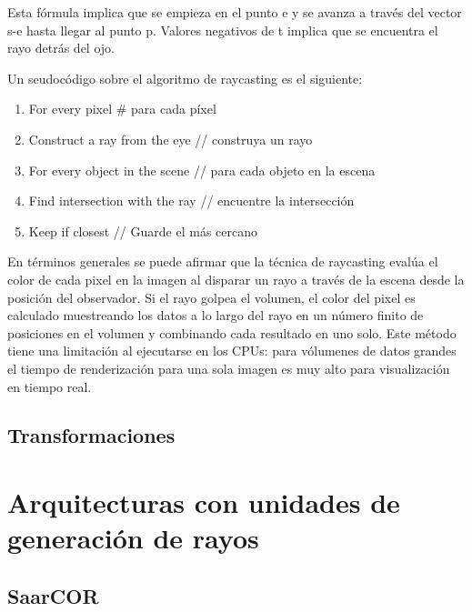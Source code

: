 Esta fórmula implica que se empieza en el punto e y se avanza a través del vector s-e hasta llegar al punto p. Valores negativos de t implica que se encuentra el rayo detrás del ojo.

Un seudocódigo sobre el algoritmo de raycasting es el siguiente:

\begin{enumerate}

\item For every pixel \# para cada píxel 
\item \hspace{5 mm} Construct a ray from the eye \hspace{3 mm} // construya un rayo
\item \hspace{5 mm} For every object in the scene \hspace{3 mm} // para cada objeto en la escena
\item \hspace{10 mm}	 Find intersection with the ray \hspace{3 mm} // encuentre la intersección 	
\item \hspace{10 mm} Keep if closest 				\hspace{3 mm} // Guarde el más cercano

\end{enumerate}

En términos generales se puede afirmar que la técnica de raycasting evalúa el color de cada pixel en la imagen al disparar un rayo a través de la escena desde la posición del observador. Si el rayo golpea el volumen, el color del pixel es calculado muestreando los datos a lo largo del rayo en un número finito de posiciones en el volumen  y combinando cada resultado en uno solo. Este método tiene una limitación al ejecutarse en los CPUs: para vólumenes de datos grandes el tiempo de renderización para una sola imagen es muy alto para visualización en tiempo real.

\subsection{Transformaciones}

\section{Arquitecturas con unidades de generación de rayos}

\subsection{SaarCOR}
